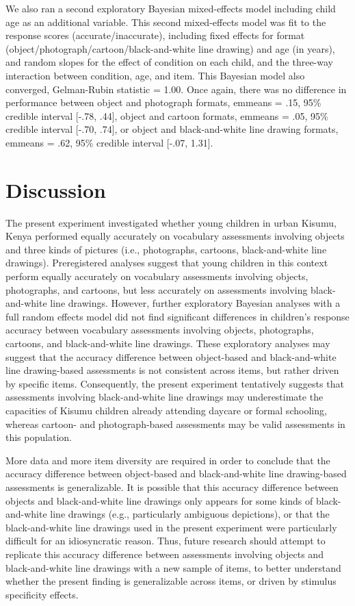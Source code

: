 \documentclass[10pt, letterpaper]{article}
\begin{document}
We also ran a second exploratory Bayesian mixed-effects model including
child age as an additional variable. This second mixed-effects model was
fit to the response scores (accurate/inaccurate), including fixed
effects for format (object/photograph/cartoon/black-and-white line
drawing) and age (in years), and random slopes for the effect of
condition on each child, and the three-way interaction between
condition, age, and item. This Bayesian model also converged,
Gelman-Rubin statistic = 1.00. Once again, there was no difference in
performance between object and photograph formats, emmeans = .15, 95\%
credible interval {[}-.78, .44{]}, object and cartoon formats, emmeans =
.05, 95\% credible interval {[}-.70, .74{]}, or object and
black-and-white line drawing formats, emmeans = .62, 95\% credible
interval {[}-.07, 1.31{]}.

\section{Discussion}\label{discussion}

The present experiment investigated whether young children in urban
Kisumu, Kenya performed equally accurately on vocabulary assessments
involving objects and three kinds of pictures (i.e., photographs,
cartoons, black-and-white line drawings). Preregistered analyses suggest
that young children in this context perform equally accurately on
vocabulary assessments involving objects, photographs, and cartoons, but
less accurately on assessments involving black-and-white line drawings.
However, further exploratory Bayesian analyses with a full random
effects model did not find significant differences in children's
response accuracy between vocabulary assessments involving objects,
photographs, cartoons, and black-and-white line drawings. These
exploratory analyses may suggest that the accuracy difference between
object-based and black-and-white line drawing-based assessments is not
consistent across items, but rather driven by specific items.
Consequently, the present experiment tentatively suggests that
assessments involving black-and-white line drawings may underestimate
the capacities of Kisumu children already attending daycare or formal
schooling, whereas cartoon- and photograph-based assessments may be
valid assessments in this population.

More data and more item diversity are required in order to conclude that
the accuracy difference between object-based and black-and-white line
drawing-based assessments is generalizable. It is possible that this
accuracy difference between objects and black-and-white line drawings
only appears for some kinds of black-and-white line drawings (e.g.,
particularly ambiguous depictions), or that the black-and-white line
drawings used in the present experiment were particularly difficult for
an idiosyncratic reason. Thus, future research should attempt to
replicate this accuracy difference between assessments involving objects
and black-and-white line drawings with a new sample of items, to better
understand whether the present finding is generalizable across items, or
driven by stimulus specificity effects.
\end{document}
